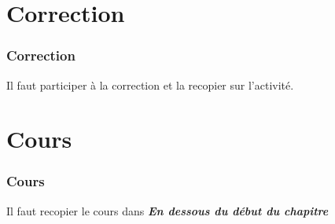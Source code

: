 \documentclass{beamer}
\begin{document}
\section{Correction}
\begin{frame}
    \frametitle{Correction}
    Il faut participer à la correction et la recopier sur l'activité.
\end{frame}

\section{Cours}
    \begin{frame}
    \frametitle{Cours}
    Il faut recopier le cours dans \textbf{\textit{En dessous du début du chapitre}}
    
\end{frame}







\end{document}
